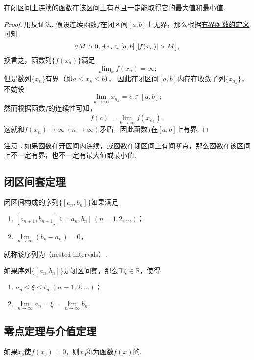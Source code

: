 \begin{theorem}[有界性与最大值最小值定理]\label{theorem:极限.闭区间上连续函数的性质.有界性与最大值最小值定理}
在闭区间上连续的函数在该区间上有界且一定能取得它的最大值和最小值.
\begin{proof}
用反证法.
假设连续函数\(f\)在闭区间\([a,b]\)上无界，那么根据\hyperref[definition:函数.函数的有界性]{有界函数的定义}可知\[
\forall M>0,
\exists x_n\in[a,b]
\bigl[
\abs{f(x_n)} > M
\bigl],
\]换言之，函数列\(\{f(x_n)\}\)满足\[
\lim\limits_{n\to\infty} f(x_n) = \infty;
\]
但是数列\(\{x_n\}\)有界（即\(a \leq x_n \leq b\)），
因此在闭区间\([a,b]\)内存在收敛子列\(\{x_{n_k}\}\)，
不妨设\[
\lim\limits_{k\to\infty} x_{n_k} = c \in [a,b];
\]
然而根据函数\(f\)的连续性可知，\[
f(c) = \lim\limits_{k\to\infty} f(x_{n_k}),
\]
这就和\(f(x_n)\to\infty\ (n\to\infty)\)矛盾，因此函数\(f\)在\([a,b]\)上有界.
\end{proof}
\end{theorem}
注意：如果函数在开区间内连续，或函数在闭区间上有间断点，那么函数在该区间上不一定有界，也不一定有最大值或最小值.

\subsection{闭区间套定理}
\begin{definition}\label{definition:极限.闭区间套的定义}
闭区间构成的序列\(\{[a_n,b_n]\}\)如果满足
\begin{enumerate}
\item \([a_{n+1},b_{n+1}] \subseteq [a_n,b_n]\ (n=1,2,\dotsc)\)；
\item \(\lim\limits_{n\to\infty} (b_n - a_n) = 0\)，
\end{enumerate}
就称该序列为（nested intervals）.
\end{definition}

\begin{theorem}\label{definition:极限.闭区间套定理}
如果序列\(\{[a_n,b_n]\}\)是闭区间套，那么\(\exists!\xi\in\mathbb{R}\)，使得
\begin{enumerate}
\item \(a_n \leq \xi \leq b_n\ (n=1,2,\dotsc)\)；
\item \(\lim\limits_{n\to\infty} a_n
= \xi
= \lim\limits_{n\to\infty} b_n\).
\end{enumerate}
\end{theorem}

\subsection{零点定理与介值定理}
\begin{definition}
如果\(x_0\)使\(f(x_0) = 0\)，则\(x_0\)称为函数\(f(x)\)的.
\end{definition}

